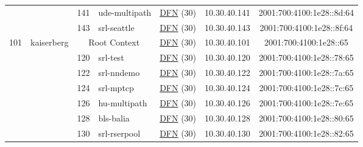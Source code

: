 \begin{small}
\begin{center}
\begin{longtable}{|c|c|c|c|c|c|c|c|}
  &  & \tiny{141} & \multicolumn{1}{|l|}{\tiny{ude-multipath}} & \multicolumn{2}{|c|}{\tiny{\href{https://www.dfn.de}{DFN} (30)}} & \tiny{10.30.40.141} & \tiny{2001:700:4100:1e28::8d:64} \\* \cline{3-3}\cline{4-4}\cline{5-5}\cline{6-6}\cline{7-7}\cline{8-8}
  &  & \tiny{143} & \multicolumn{1}{|l|}{\tiny{srl-seattle}} & \multicolumn{2}{|c|}{\tiny{\href{https://www.dfn.de}{DFN} (30)}} & \tiny{10.30.40.143} & \tiny{2001:700:4100:1e28::8f:64} \\ \hline
 \multirow{13}{*}{\tiny{101}} & \multicolumn{1}{|l|}{\multirow{13}{*}{\tiny{kaiserberg}}} & \multicolumn{2}{|c|}{\tiny{Root Context}} & \multicolumn{2}{|c|}{\tiny{\href{https://www.dfn.de}{DFN} (30)}} & \tiny{10.30.40.101} & \tiny{2001:700:4100:1e28::65} \\* \cline{3-3}\cline{4-4}\cline{5-5}\cline{6-6}\cline{7-7}\cline{8-8}
  &  & \tiny{120} & \multicolumn{1}{|l|}{\tiny{srl-test}} & \multicolumn{2}{|c|}{\tiny{\href{https://www.dfn.de}{DFN} (30)}} & \tiny{10.30.40.120} & \tiny{2001:700:4100:1e28::78:65} \\* \cline{3-3}\cline{4-4}\cline{5-5}\cline{6-6}\cline{7-7}\cline{8-8}
  &  & \tiny{122} & \multicolumn{1}{|l|}{\tiny{srl-nndemo}} & \multicolumn{2}{|c|}{\tiny{\href{https://www.dfn.de}{DFN} (30)}} & \tiny{10.30.40.122} & \tiny{2001:700:4100:1e28::7a:65} \\* \cline{3-3}\cline{4-4}\cline{5-5}\cline{6-6}\cline{7-7}\cline{8-8}
  &  & \tiny{124} & \multicolumn{1}{|l|}{\tiny{srl-mptcp}} & \multicolumn{2}{|c|}{\tiny{\href{https://www.dfn.de}{DFN} (30)}} & \tiny{10.30.40.124} & \tiny{2001:700:4100:1e28::7c:65} \\* \cline{3-3}\cline{4-4}\cline{5-5}\cline{6-6}\cline{7-7}\cline{8-8}
  &  & \tiny{126} & \multicolumn{1}{|l|}{\tiny{hu-multipath}} & \multicolumn{2}{|c|}{\tiny{\href{https://www.dfn.de}{DFN} (30)}} & \tiny{10.30.40.126} & \tiny{2001:700:4100:1e28::7e:65} \\* \cline{3-3}\cline{4-4}\cline{5-5}\cline{6-6}\cline{7-7}\cline{8-8}
  &  & \tiny{128} & \multicolumn{1}{|l|}{\tiny{bls-balia}} & \multicolumn{2}{|c|}{\tiny{\href{https://www.dfn.de}{DFN} (30)}} & \tiny{10.30.40.128} & \tiny{2001:700:4100:1e28::80:65} \\* \cline{3-3}\cline{4-4}\cline{5-5}\cline{6-6}\cline{7-7}\cline{8-8}
  &  & \tiny{130} & \multicolumn{1}{|l|}{\tiny{srl-rserpool}} & \multicolumn{2}{|c|}{\tiny{\href{https://www.dfn.de}{DFN} (30)}} & \tiny{10.30.40.130} & \tiny{2001:700:4100:1e28::82:65} \\* \cline{3-3}\cline{4-4}\cline{5-5}\cline{6-6}\cline{7-7}\cline{8-8}

\end{longtable}
\end{center}
\end{small}
